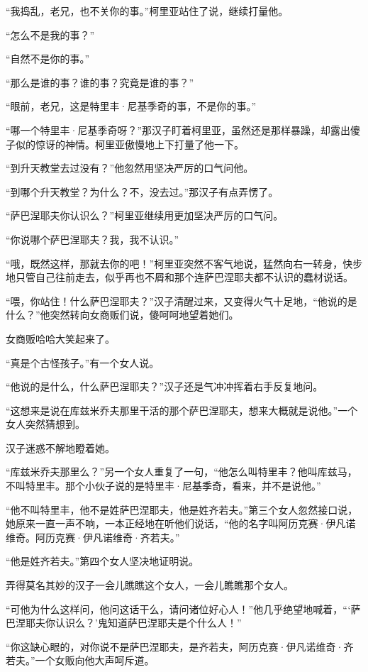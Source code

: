\par “我捣乱，老兄，也不关你的事。”柯里亚站住了说，继续打量他。
\par “怎么不是我的事？”
\par “自然不是你的事。”
\par “那么是谁的事？谁的事？究竟是谁的事？”
\par “眼前，老兄，这是特里丰·尼基季奇的事，不是你的事。”
\par “哪一个特里丰·尼基季奇呀？”那汉子盯着柯里亚，虽然还是那样暴躁，却露出傻子似的惊讶的神情。柯里亚傲慢地上下打量了他一下。
\par “到升天教堂去过没有？”他忽然用坚决严厉的口气问他。
\par “到哪个升天教堂？为什么？不，没去过。”那汉子有点弄愣了。
\par “萨巴涅耶夫你认识么？”柯里亚继续用更加坚决严厉的口气问。
\par “你说哪个萨巴涅耶夫？我，我不认识。”
\par “哦，既然这样，那就去你的吧！”柯里亚突然不客气地说，猛然向右一转身，快步地只管自己往前走去，似乎再也不屑和那个连萨巴涅耶夫都不认识的蠢材说话。
\par “喂，你站住！什么萨巴涅耶夫？”汉子清醒过来，又变得火气十足地，“他说的是什么？”他突然转向女商贩们说，傻呵呵地望着她们。
\par 女商贩哈哈大笑起来了。
\par “真是个古怪孩子。”有一个女人说。
\par “他说的是什么，什么萨巴涅耶夫？”汉子还是气冲冲挥着右手反复地问。
\par “这想来是说在库兹米乔夫那里干活的那个萨巴涅耶夫，想来大概就是说他。”一个女人突然猜想到。
\par 汉子迷惑不解地瞪着她。
\par “库兹米乔夫那里么？”另一个女人重复了一句，“他怎么叫特里丰？他叫库兹马，不叫特里丰。那个小伙子说的是特里丰·尼基季奇，看来，并不是说他。”
\par “他不叫特里丰，他不是姓萨巴涅耶夫，他是姓齐若夫。”第三个女人忽然接口说，她原来一直一声不响，一本正经地在听他们说话，“他的名字叫阿历克赛·伊凡诺维奇。阿历克赛·伊凡诺维奇·齐若夫。”
\par “他是姓齐若夫。”第四个女人坚决地证明说。
\par 弄得莫名其妙的汉子一会儿瞧瞧这个女人，一会儿瞧瞧那个女人。
\par “可他为什么这样问，他问这话干么，请问诸位好心人！”他几乎绝望地喊着，“‘萨巴涅耶夫你认识么？’鬼知道萨巴涅耶夫是个什么人！”
\par “你这缺心眼的，对你说不是萨巴涅耶夫，是齐若夫，阿历克赛·伊凡诺维奇·齐若夫。”一个女贩向他大声呵斥道。
